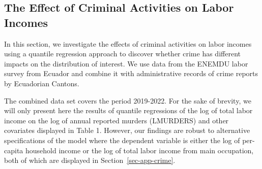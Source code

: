 \documentclass[
  12pt,
  oneside]{article}
\begin{document}
\begin{table}[h]
{}

\end{table}%

\subsection{The Effect of Criminal Activities on Labor
Incomes}\label{sec-crime}

In this section, we investigate the effects of criminal activities on
labor incomes using a quantile regression approach to discover whether
crime has different impacts on the distribution of interest. We use data
from the ENEMDU labor survey from Ecuador and combine it with
administrative records of crime reports by Ecuadorian Cantons.

The combined data set covers the period 2019-2022. For the sake of
brevity, we will only present here the results of quantile regressions
of the log of total labor income on the log of annual reported murders
(LMURDERS) and other covariates displayed in Table 1. However, our
findings are robust to alternative specifications of the model where the
dependent variable is either the log of per-capita household income or
the log of total labor income from main occupation, both of which are
displayed in Section~\ref{sec-app-crime}.
\end{document}
